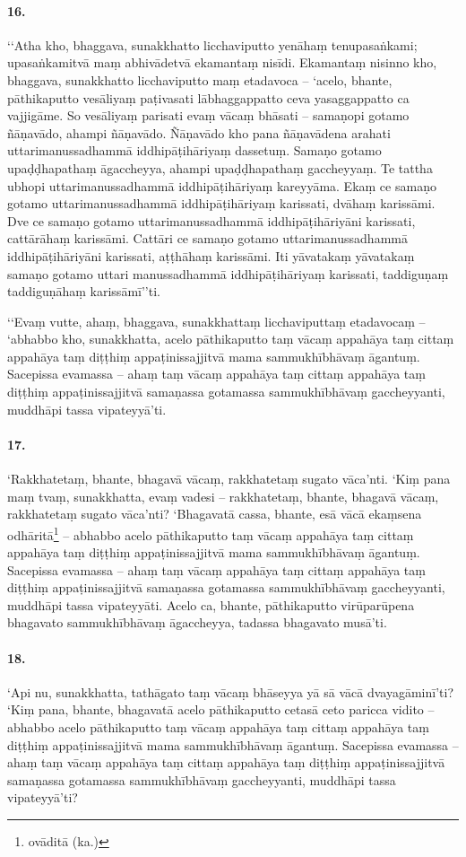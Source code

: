 \paragraph{16.} ‘‘Atha kho, bhaggava, sunakkhatto licchaviputto yenāhaṃ tenupasaṅkami; upasaṅkamitvā maṃ abhivādetvā ekamantaṃ nisīdi. Ekamantaṃ nisinno kho, bhaggava, sunakkhatto licchaviputto maṃ etadavoca – ‘acelo, bhante, pāthikaputto vesāliyaṃ paṭivasati lābhaggappatto ceva yasaggappatto ca vajjigāme. So vesāliyaṃ parisati evaṃ vācaṃ bhāsati – samaṇopi gotamo ñāṇavādo, ahampi ñāṇavādo. Ñāṇavādo kho pana ñāṇavādena arahati uttarimanussadhammā iddhipāṭihāriyaṃ dassetuṃ. Samaṇo gotamo upaḍḍhapathaṃ āgaccheyya, ahampi upaḍḍhapathaṃ gaccheyyaṃ. Te tattha ubhopi uttarimanussadhammā iddhipāṭihāriyaṃ kareyyāma. Ekaṃ ce samaṇo gotamo uttarimanussadhammā iddhipāṭihāriyaṃ karissati, dvāhaṃ karissāmi. Dve ce samaṇo gotamo uttarimanussadhammā iddhipāṭihāriyāni karissati, cattārāhaṃ karissāmi. Cattāri ce samaṇo gotamo uttarimanussadhammā iddhipāṭihāriyāni karissati, aṭṭhāhaṃ karissāmi. Iti yāvatakaṃ yāvatakaṃ samaṇo gotamo uttari manussadhammā iddhipāṭihāriyaṃ karissati, taddiguṇaṃ taddiguṇāhaṃ karissāmī’’ti.

‘‘Evaṃ vutte, ahaṃ, bhaggava, sunakkhattaṃ licchaviputtaṃ etadavocaṃ – ‘abhabbo kho, sunakkhatta, acelo pāthikaputto taṃ vācaṃ appahāya taṃ cittaṃ appahāya taṃ diṭṭhiṃ appaṭinissajjitvā mama sammukhībhāvaṃ āgantuṃ. Sacepissa evamassa – ahaṃ taṃ vācaṃ appahāya taṃ cittaṃ appahāya taṃ diṭṭhiṃ appaṭinissajjitvā samaṇassa gotamassa sammukhībhāvaṃ gaccheyyanti, muddhāpi tassa vipateyyā’ti.

\paragraph{17.} ‘Rakkhatetaṃ, bhante, bhagavā vācaṃ, rakkhatetaṃ sugato vāca’nti. ‘Kiṃ pana maṃ tvaṃ, sunakkhatta, evaṃ vadesi – rakkhatetaṃ, bhante, bhagavā vācaṃ, rakkhatetaṃ sugato vāca’nti? ‘Bhagavatā cassa, bhante, esā vācā ekaṃsena odhāritā\footnote{ovāditā (ka.)} – abhabbo acelo pāthikaputto taṃ vācaṃ appahāya taṃ cittaṃ appahāya taṃ diṭṭhiṃ appaṭinissajjitvā mama sammukhībhāvaṃ āgantuṃ. Sacepissa evamassa – ahaṃ taṃ vācaṃ appahāya taṃ cittaṃ appahāya taṃ diṭṭhiṃ appaṭinissajjitvā samaṇassa gotamassa sammukhībhāvaṃ gaccheyyanti, muddhāpi tassa vipateyyāti. Acelo ca, bhante, pāthikaputto virūparūpena bhagavato sammukhībhāvaṃ āgaccheyya, tadassa bhagavato musā’ti.

\paragraph{18.} ‘Api nu, sunakkhatta, tathāgato taṃ vācaṃ bhāseyya yā sā vācā dvayagāminī’ti? ‘Kiṃ pana, bhante, bhagavatā acelo pāthikaputto cetasā ceto paricca vidito – abhabbo acelo pāthikaputto taṃ vācaṃ appahāya taṃ cittaṃ appahāya taṃ diṭṭhiṃ appaṭinissajjitvā mama sammukhībhāvaṃ āgantuṃ. Sacepissa evamassa – ahaṃ taṃ vācaṃ appahāya taṃ cittaṃ appahāya taṃ diṭṭhiṃ appaṭinissajjitvā samaṇassa gotamassa sammukhībhāvaṃ gaccheyyanti, muddhāpi tassa vipateyyā’ti?

